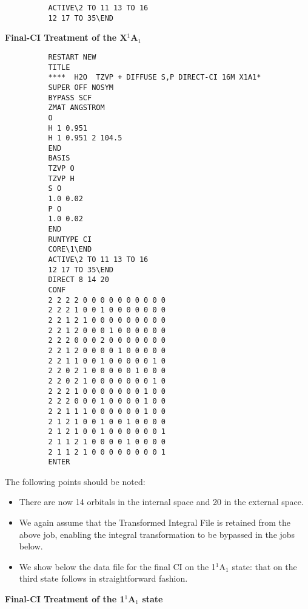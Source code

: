 \documentclass[11pt,fleqn]{article}
\newcommand{\xastate}{\mbox{X$^{1}$A$_{1}$}}
\begin{document}
{
\footnotesize
\begin{verbatim}
          ACTIVE\2 TO 11 13 TO 16 
          12 17 TO 35\END
\end{verbatim}
}
{\bf Final-CI Treatment of the \xastate}
{
\footnotesize
\begin{verbatim}
          RESTART NEW
          TITLE  
          ****  H2O  TZVP + DIFFUSE S,P DIRECT-CI 16M X1A1*
          SUPER OFF NOSYM
          BYPASS SCF
          ZMAT ANGSTROM
          O
          H 1 0.951
          H 1 0.951 2 104.5
          END
          BASIS 
          TZVP O
          TZVP H
          S O
          1.0 0.02
          P O
          1.0 0.02
          END
          RUNTYPE CI
          CORE\1\END
          ACTIVE\2 TO 11 13 TO 16 
          12 17 TO 35\END
          DIRECT 8 14 20
          CONF
          2 2 2 2 0 0 0 0 0 0 0 0 0 0
          2 2 2 1 0 0 1 0 0 0 0 0 0 0
          2 2 1 2 1 0 0 0 0 0 0 0 0 0
          2 2 1 2 0 0 0 1 0 0 0 0 0 0
          2 2 2 0 0 0 2 0 0 0 0 0 0 0
          2 2 1 2 0 0 0 0 1 0 0 0 0 0
          2 2 1 1 0 0 1 0 0 0 0 0 1 0
          2 2 0 2 1 0 0 0 0 0 1 0 0 0
          2 2 0 2 1 0 0 0 0 0 0 0 1 0
          2 2 2 1 0 0 0 0 0 0 0 1 0 0
          2 2 2 0 0 0 1 0 0 0 0 1 0 0
          2 2 1 1 1 0 0 0 0 0 0 1 0 0
          2 1 2 1 0 0 1 0 0 1 0 0 0 0
          2 1 2 1 0 0 1 0 0 0 0 0 0 1
          2 1 1 2 1 0 0 0 0 1 0 0 0 0
          2 1 1 2 1 0 0 0 0 0 0 0 0 1
          ENTER
\end{verbatim}
}
The following points should be noted:
\begin{itemize}
\item There are now 14 orbitals in the internal space and
20 in the external space.
\item We again assume that the Transformed Integral File
is retained from the above job, enabling the integral
transformation to be bypassed in the jobs below.
\item We show below the data file for the final CI
on the 1$^{1}$A$_{1}$ state: that on the third state
follows in straightforward fashion.
\end{itemize}
{\bf Final-CI Treatment of the 1$^{1}$A$_{1}$ state}
\end{document}
